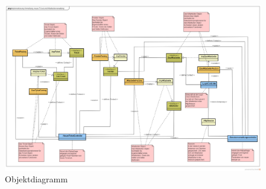 \documentclass[12pt, a4paper]{article}
\begin{document}
\begin{figure}[H]
	\begin{center}
		\includegraphics[width=220mm,angle=90]{Bilder/ObjektDiagramm.png}
	\end{center}
	\caption{Objektdiagramm}
\end{figure}







\end{document}
